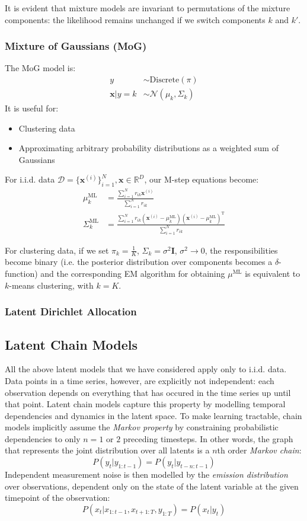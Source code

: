 \documentclass[a4paper]{article}
\begin{document}
It is evident that mixture models are invariant to permutations of the mixture components: the likelihood remains unchanged if we switch components $k$ and $k'$.

\subsubsection{Mixture of Gaussians (MoG)}
The MoG model is:
\begin{align*}
y &\sim \textrm{Discrete}(\pi) \\
\mathbf{x}|y=k &\sim \mathcal{N}(\mu_k,\Sigma_k)
\end{align*}
It is useful for:
\begin{itemize}
\item Clustering data
\item Approximating arbitrary probability distributions as a weighted sum of Gaussians
\end{itemize}
For i.i.d. data $\mathcal{D} = \{\mathbf{x}^{(i)}\}_{i=1}^N, \mathbf{x}\in\mathbb{R}^D$, our M-step equations become:
\begin{align*}
\mu_k^\textrm{ML} &= \frac{\sum_{i=1}^N r_{ik}\mathbf{x}^{(i)}}{\sum_{i=1}^N r_{ik}} \\
\Sigma_k^\textrm{ML} &= \frac{\sum_{i=1}^N r_{ik}(\mathbf{x}^{(i)}-\mu_k^\textrm{ML})(\mathbf{x}^{(i)}-\mu_k^\textrm{ML})^\textrm{T}}{\sum_{i=1}^N r_{ik}}
\end{align*}

For clustering data, if we set $\pi_k=\frac{1}{K}$, $\Sigma_k = \sigma^2\mathbf{I}$, $\sigma^2 \rightarrow 0$, the responsibilities become binary (i.e. the posterior distribution over components becomes a $\delta$-function) and the corresponding EM algorithm for obtaining $\mu^\textrm{ML}$ is equivalent to $k$-means clustering, with $k=K$.

\subsubsection{Latent Dirichlet Allocation}

\subsection{Latent Chain Models}
All the above latent models that we have considered apply only to i.i.d. data. Data points in a time series, however, are explicitly not independent: each observation depends on everything that has occured in the time series up until that point. Latent chain models capture this property by modelling temporal dependencies and dynamics in the latent space. To make learning tractable, chain models implicitly assume the \emph{Markov property} by constraining probabilistic dependencies to only $n=1$ or $2$ preceding timesteps. In other words, the graph that represents the joint distribution over all latents is a $n$th order \emph{Markov chain}: 
\[P(y_t|y_{1:t-1})=P(y_t|y_{t-n:t-1})\]
Independent measurement noise is then modelled by the \emph{emission distribution} over observations, dependent only on the state of the latent variable at the given timepoint of the observation:
\[P(x_t|x_{1:t-1},x_{t+1:T},y_{1:T}) = P(x_t|y_t)\]
\end{document}
